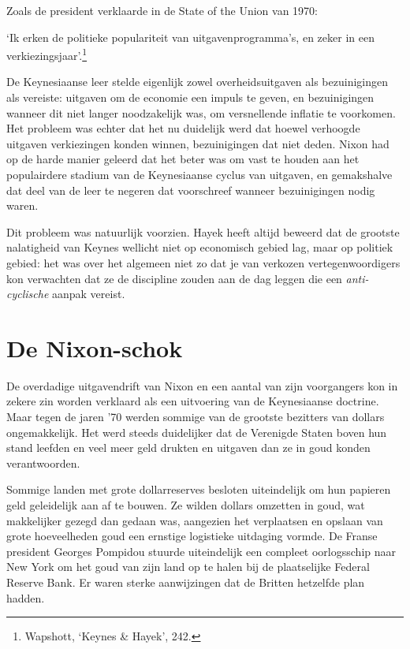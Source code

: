 \documentclass[
  a5paper,
  smalldemyvopaper,11pt,twoside,onecolumn,openright,extrafontsizes]{memoir}
\begin{document}
Zoals de president verklaarde in de State of the Union van 1970:

`Ik erken de politieke populariteit van uitgavenprogramma's, en zeker in
een verkiezingsjaar'.\footnote{\hspace{0pt}Wapshott, `Keynes \& Hayek',
  242.}

De Keynesiaanse leer stelde eigenlijk zowel overheidsuitgaven als
bezuinigingen als vereiste: uitgaven om de economie een impuls te geven,
en bezuinigingen wanneer dit niet langer noodzakelijk was, om
versnellende inflatie te voorkomen. Het probleem was echter dat het nu
duidelijk werd dat hoewel verhoogde uitgaven verkiezingen konden winnen,
bezuinigingen dat niet deden. Nixon had op de harde manier geleerd dat
het beter was om vast te houden aan het populairdere stadium van de
Keynesiaanse cyclus van uitgaven, en gemakshalve dat deel van de leer te
negeren dat voorschreef wanneer bezuinigingen nodig waren.

Dit probleem was natuurlijk voorzien. Hayek heeft altijd beweerd dat de
grootste nalatigheid van Keynes wellicht niet op economisch gebied lag,
maar op politiek gebied: het was over het algemeen niet zo dat je van
verkozen vertegenwoordigers kon verwachten dat ze de discipline zouden
aan de dag leggen die een \emph{anti-cyclische} aanpak vereist.

\section{De Nixon-schok}\label{de-nixon-schok}

De overdadige uitgavendrift van Nixon en een aantal van zijn voorgangers
kon in zekere zin worden verklaard als een uitvoering van de
Keynesiaanse doctrine. Maar tegen de jaren '70 werden sommige van de
grootste bezitters van dollars ongemakkelijk. Het werd steeds
duidelijker dat de Verenigde Staten boven hun stand leefden en veel meer
geld drukten en uitgaven dan ze in goud konden verantwoorden.

Sommige landen met grote dollarreserves besloten uiteindelijk om hun
papieren geld geleidelijk aan af te bouwen. Ze wilden dollars omzetten
in goud, wat makkelijker gezegd dan gedaan was, aangezien het
verplaatsen en opslaan van grote hoeveelheden goud een ernstige
logistieke uitdaging vormde. De Franse president Georges Pompidou
stuurde uiteindelijk een compleet oorlogsschip naar New York om het goud
van zijn land op te halen bij de plaatselijke Federal Reserve Bank. Er
waren sterke aanwijzingen dat de Britten hetzelfde plan hadden.
\end{document}
